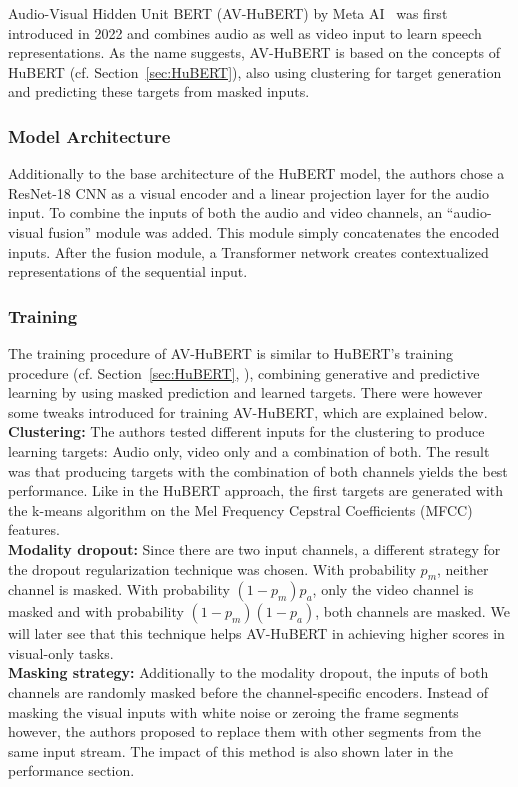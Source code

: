 Audio-Visual Hidden Unit BERT (AV-HuBERT) by Meta AI~\cite{AV_HuBERT} was first introduced in 2022 and combines audio as well as video input to learn speech representations. As the name suggests, AV-HuBERT is based on the concepts of HuBERT (cf. Section~\ref{sec:HuBERT}), also using clustering for target generation and predicting these targets from masked inputs.
\subsubsection{Model Architecture}
Additionally to the base architecture of the HuBERT model, the authors chose a ResNet-18 CNN as a visual encoder and a linear projection layer for the audio input. To combine the inputs of both the audio and video channels, an ``audio-visual fusion'' module was added. This module simply concatenates the encoded inputs. After the fusion module, a Transformer network creates contextualized representations of the sequential input.
\subsubsection{Training}\label{sec:av-hubert-training}
The training procedure of AV-HuBERT is similar to HuBERT's training procedure (cf. Section~\ref{sec:HuBERT}, \cite{hubert}), combining generative and predictive learning by using masked prediction and learned targets. There were however some tweaks introduced for training AV-HuBERT, which are explained below.\\
\textbf{Clustering:} The authors tested different inputs for the clustering to produce learning targets: Audio only, video only and a combination of both. The result was that producing targets with the combination of both channels yields the best performance. Like in the HuBERT approach, the first targets are generated with the k-means algorithm on the Mel Frequency Cepstral Coefficients (MFCC) features.\\
\textbf{Modality dropout:} Since there are two input channels, a different strategy for the dropout regularization technique was chosen. With probability $p_m$, neither channel is masked. With probability $(1-p_m)p_a$, only the video channel is masked and with probability $(1-p_m)(1-p_a)$, both channels are masked. We will later see that this technique helps AV-HuBERT in achieving higher scores in visual-only tasks.\\
\textbf{Masking strategy:} Additionally to the modality dropout, the inputs of both channels are randomly masked before the channel-specific encoders. Instead of masking the visual inputs with white noise or zeroing the frame segments however, the authors proposed to replace them with other segments from the same input stream. The impact of this method is also shown later in the performance section.
